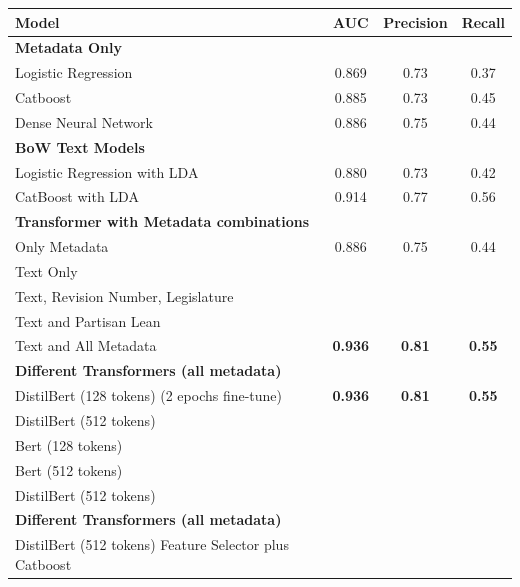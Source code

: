 \documentclass[11pt]{article}
\begin{document}
\begin{tabular}{ l  c  c  c}
 Model & AUC & Precision & Recall  \\
 \hline
 \textbf{Metadata Only} & & & \\
\hspace{3mm}Logistic Regression & 0.869 & 0.73 & 0.37 \\
\hspace{3mm}Catboost  & 0.885 & 0.73 & 0.45 \\
\hspace{3mm} Dense Neural Network & 0.886 &  0.75 & 0.44 \\
\hline
\textbf{BoW Text Models} & & & \\
\hspace{3mm}Logistic Regression with LDA & 0.880 & 0.73 & 0.42 \\
\hspace{3mm}CatBoost with LDA & 0.914 & 0.77 & 0.56 \\ 
\hline
\textbf{Transformer with Metadata combinations} & & & \\
\hspace{3mm}Only Metadata & 0.886 &  0.75 & 0.44 \\
\hspace{3mm}Text Only & & & \\
\hspace{3mm}Text, Revision Number, Legislature & & & \\
\hspace{3mm}Text and Partisan Lean & & & \\
\hspace{3mm}Text and All Metadata & \textbf{ 0.936 }& \textbf{0.81} & \textbf{0.55} \\
\hline
\textbf{Different Transformers (all metadata)} & & & \\
\hspace{3mm}DistilBert (128 tokens) (2 epochs fine-tune) & \textbf{ 0.936 }& \textbf{0.81} & \textbf{0.55} \\
\hspace{3mm}DistilBert (512 tokens)  &  & & \\
\hspace{3mm}Bert (128 tokens) &  & & \\
\hspace{3mm}Bert (512 tokens)  &  & & \\
\hspace{3mm}DistilBert (512 tokens) &  & & \\
\hline
\textbf{Different Transformers (all metadata)} & & & \\
\hspace{3mm}DistilBert (512 tokens) Feature Selector plus Catboost&  & & \\

\end{tabular}
\end{document}

